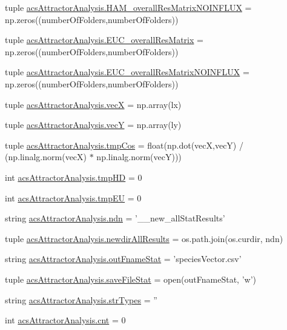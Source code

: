 \begin{DoxyCompactItemize}
\item 
tuple \hyperlink{a00124_a9aa1adb46370d97e4f38e7f09eb7a97c}{acs\+Attractor\+Analysis.\+H\+A\+M\+\_\+overall\+Res\+Matrix\+N\+O\+I\+N\+F\+L\+U\+X} = np.\+zeros((number\+Of\+Folders,number\+Of\+Folders))
\item 
tuple \hyperlink{a00124_a920167afed4efad8feefc27bdbadba89}{acs\+Attractor\+Analysis.\+E\+U\+C\+\_\+overall\+Res\+Matrix} = np.\+zeros((number\+Of\+Folders,number\+Of\+Folders))
\item 
tuple \hyperlink{a00124_a4214c876be4247f0643fc749beb35787}{acs\+Attractor\+Analysis.\+E\+U\+C\+\_\+overall\+Res\+Matrix\+N\+O\+I\+N\+F\+L\+U\+X} = np.\+zeros((number\+Of\+Folders,number\+Of\+Folders))
\item 
tuple \hyperlink{a00124_af20e9c92b7d977049b881882c0d1382c}{acs\+Attractor\+Analysis.\+vec\+X} = np.\+array(lx)
\item 
tuple \hyperlink{a00124_a691fb5bd87af2162b5acaf48ea4c06e7}{acs\+Attractor\+Analysis.\+vec\+Y} = np.\+array(ly)
\item 
tuple \hyperlink{a00124_a305669433b259c5ffcb797769e7c30df}{acs\+Attractor\+Analysis.\+tmp\+Cos} = float(np.\+dot(vec\+X,vec\+Y) / (np.\+linalg.\+norm(vec\+X) $\ast$ np.\+linalg.\+norm(vec\+Y)))
\item 
int \hyperlink{a00124_a1fe1582f1d1dc5f55558d25c8eb30ad7}{acs\+Attractor\+Analysis.\+tmp\+H\+D} = 0
\item 
int \hyperlink{a00124_a0c4860774229747cda9dabe70614abc6}{acs\+Attractor\+Analysis.\+tmp\+E\+U} = 0
\item 
string \hyperlink{a00124_a109ce3a379d650b3f9b08debc0433a19}{acs\+Attractor\+Analysis.\+ndn} = '\+\_\+\_\+new\+\_\+all\+Stat\+Results'
\item 
tuple \hyperlink{a00124_ae620f985669aed90dc070824420d4b5e}{acs\+Attractor\+Analysis.\+newdir\+All\+Results} = os.\+path.\+join(os.\+curdir, ndn)
\item 
string \hyperlink{a00124_aeecfcdefbc44b2b2ceff4c9b6f737f27}{acs\+Attractor\+Analysis.\+out\+Fname\+Stat} = 'species\+Vector.\+csv'
\item 
tuple \hyperlink{a00124_acc1016f353d0e1b36c837cb0b480edef}{acs\+Attractor\+Analysis.\+save\+File\+Stat} = open(out\+Fname\+Stat, 'w')
\item 
string \hyperlink{a00124_ae5f324ca114055fca79473eecd17bb80}{acs\+Attractor\+Analysis.\+str\+Types} = ''
\item 
int \hyperlink{a00124_a8ec106a228fafb4c290946a7b7f8b6da}{acs\+Attractor\+Analysis.\+cnt} = 0
\end{DoxyCompactItemize}
